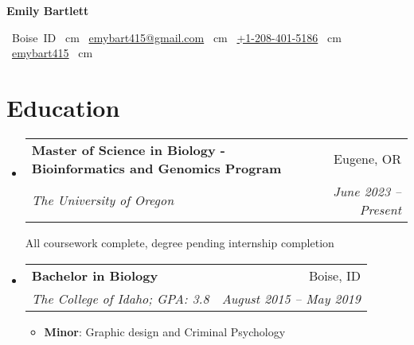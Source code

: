 \documentclass[letterpaper,11pt]{article}
\makeatletter
\newcommand{\resumeItemColon}[2]{
  \item\small{
    \textbf{#1}{: #2 \vspace{-2pt}}
  }
}
\newcommand{\resumeSubheading}[4]{
  \vspace{-1pt}\item
    \begin{tabular*}{0.97\textwidth}[t]{l@{\extracolsep{\fill}}r}
      \textbf{#1} & #2 \\
      \textit{\small#3} & \textit{\small #4} \\
    \end{tabular*}\vspace{-5pt}
}
\newcommand{\resumeSubHeadingListStart}{\begin{itemize}[leftmargin=*]}
\newcommand{\resumeSubHeadingListEnd}{\end{itemize}}
\newcommand{\resumeItemListStart}{\begin{itemize}}
\newcommand{\resumeItemListEnd}{\end{itemize}\vspace{-5pt}}
\newenvironment{header}{
    \setlength{\topsep}{0pt}\par\kern\topsep\centering\linespread{1.5}
}{
    \par\kern\topsep
} %
\let\hrefWithoutArrow\href
\renewcommand{\href}[2]{\hrefWithoutArrow{#1}{\mbox{\ifthenelse{\equal{#2}{}}{ }{#2 }\raisebox{.15ex}{\footnotesize \faExternalLink*}}}}
\makeatother
\begin{document}

\begin{header}
  \textbf{\fontsize{30 pt}{30 pt}\selectfont Emily Bartlett}

  \vspace{0.3 cm}

  \normalsize
  \mbox{
      {\color{black}{\footnotesize\faMapMarker*}\hspace*{0.13cm}Boise ID}
  }
   cm
  \mbox{
      \hrefWithoutArrow{mailto:ebart415@gmail.com}{\color{black}{\footnotesize\faEnvelope[regular]}\hspace*{0.13cm}emybart415@gmail.com}
  }
   cm
  \mbox{
      \hrefWithoutArrow{tel:+12084015186}{\color{black}{\footnotesize\faPhone*}\hspace*{0.13cm}+1-208-401-5186}
  }
   cm
  \mbox{
      \hrefWithoutArrow{https://github.com/emybart415}{\color{black}{\footnotesize\faGithub}\hspace*{0.13cm}emybart415}
  }
   cm
\end{header}


\section{Education}
  \resumeSubHeadingListStart
    \resumeSubheading
      {Master of Science in Biology - Bioinformatics and Genomics Program}{Eugene, OR}
      {The University of Oregon}{June 2023 -- Present}
    
\smallskip
      {All coursework complete, degree pending internship completion}
    \resumeSubheading
      {Bachelor in Biology}{Boise, ID}
      {The College of Idaho; GPA: 3.8}{August 2015 -- May 2019}
      \resumeItemListStart
        \resumeItemColon{Minor}
          {Graphic design and Criminal Psychology}
      \resumeItemListEnd
  \resumeSubHeadingListEnd
\end{document}
